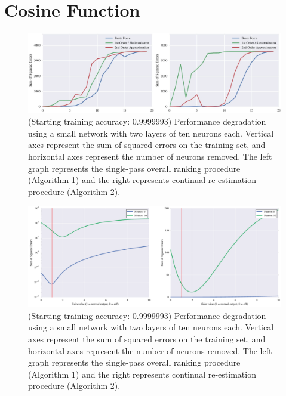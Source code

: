 \section{Cosine Function}

\begin{figure}
  \includegraphics[width=\linewidth]{cosine-small.png}
  \caption{(Starting training accuracy: 0.9999993) Performance degradation using a small network with two layers of ten neurons each. Vertical axes represent the sum of squared errors on the training set, and horizontal axes represent the number of neurons removed. The left graph represents the single-pass overall ranking procedure (Algorithm 1) and the right represents continual re-estimation procedure (Algorithm 2).}
  \label{fig:cosine-small}
\end{figure}

\begin{figure}
  \includegraphics[width=\linewidth]{cos-small-bf.png}
  \caption{(Starting training accuracy: 0.9999993) Performance degradation using a small network with two layers of ten neurons each. Vertical axes represent the sum of squared errors on the training set, and horizontal axes represent the number of neurons removed. The left graph represents the single-pass overall ranking procedure (Algorithm 1) and the right represents continual re-estimation procedure (Algorithm 2).}
  \label{fig:cosine-small}
\end{figure}

